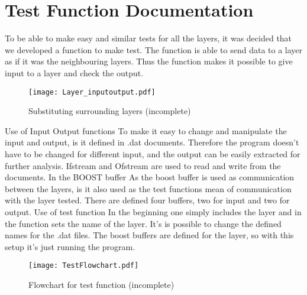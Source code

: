 \section{Test Function Documentation}
To be able to make easy and similar tests for all the layers, it was decided that we developed a function to make test. The function is able to send data to a layer as if it was the neighbouring layers. Thus the function makes it possible to give input to a layer and check the output.

\begin{figure}[htb]
	\begin{center}
	\texttt{[image: Layer\_inputoutput.pdf]}
	\caption{Substituting surrounding layers (incomplete)}
	\label{fig:Layer_inputoutput}	
	\end{center}
\end{figure}

Use of Input Output functions
To make it easy to change and manipulate the input and output, is it defined in .dat documents. Therefore the program doesn't have to be changed for different input, and the output can be easily extracted for further analysis. Ifstream and Ofstream are used to read and write from the documents. In the 
BOOST buffer
As the boost buffer is used as communication between the layers, is it also used as the test functions mean of communication with the layer tested. There are defined four buffers, two for input and two for output.
Use of test function
In the beginning one simply includes the layer and in the function sets the name of the layer. It's is possible to change the defined names for the .dat files. The boost buffers are defined for the layer, so with this setup it's just running the program.

\begin{figure}[htb]
	\begin{center}
	\texttt{[image: TestFlowchart.pdf]}
	\caption{Flowchart for test function (incomplete)}
	\label{fig:TestFlowchart}	
	\end{center}
\end{figure}

